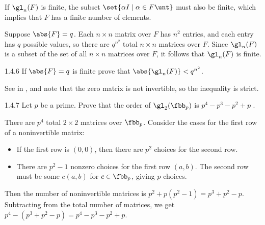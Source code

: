 \begin{soliff}
    \rightimp If $\gl_n(F)$ is finite, the subset $\set{\alpha I \mid \alpha\in F\unt}$ must also be finite, which implies that $F$ has a finite number of elements.

    \leftimp Suppose $\abs{F} = q$.
    Each $n \times n$ matrix over $F$ has $n^2$ entries, and each entry has $q$ possible values, so there are $q^{n^2}$ total $n \times n$ matrices over $F$.
    Since $\gl_n(F)$ is a subset of the set of all $n \times n$ matrices over $F$, it follows that $\gl_n(F)$ is finite.
\end{soliff}

\begin{exercise}{1.4.6}
    If $\abs{F} = q$ is finite prove that $\abs{\gl_n(F)} < q^{n^2}$.
\end{exercise}

\begin{sol}
    See \leftimp in , and note that the zero matrix is not invertible, so the inequality is strict.
\end{sol}

\begin{exercise}{1.4.7}
    Let $p$ be a prime.
	Prove that the order of $\gl_2(\fbb_p)$ is $p^4 - p^3 - p^2 + p$
    .
\end{exercise}

\begin{sol}
    There are $p^4$ total $2 \times 2$ matrices over $\fbb_p$.
    Consider the cases for the first row of a noninvertible matrix:
    \begin{itemize}
        \item If the first row is $(0, 0)$, then there are $p^2$ choices for the second row.
        \item There are $p^2 - 1$ nonzero choices for the first row $(a, b)$.
        The second row must be some $c(a, b)$ for $c \in \fbb_p$, giving $p$ choices.
    \end{itemize}
    Then the number of noninvertible matrices is $p^2 + p(p^2 - 1) = p^3 + p^2 - p$.
	Subtracting from the total number of matrices, we get $p^4 - (p^3 + p^2 - p) = p^4 - p^3 - p^2 + p$.
\end{sol}

